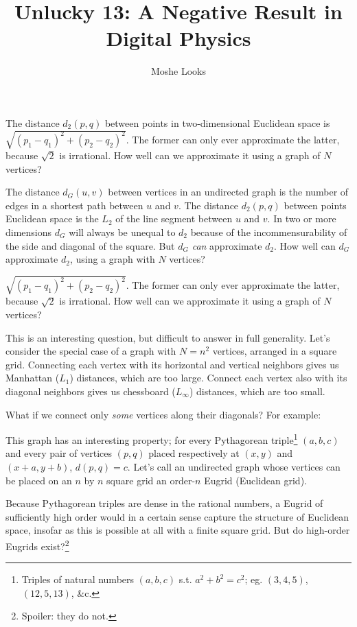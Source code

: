 \documentclass{article}
\begin{document}
\title{Unlucky 13: A Negative Result in Digital Physics}
\author{Moshe Looks}


\maketitle


The distance $d_2(p, q)$ between points in two-dimensional
Euclidean space is $\sqrt{(p_1 - q_1)^2 + (p_2 - q_2)^2}$. The former can only ever
approximate the latter, because $\sqrt{2}$ is irrational. How well can we approximate it
using a graph of $N$ vertices?


The distance $d_G(u, v)$ between vertices in an undirected graph is the number of edges in a
shortest path between $u$ and $v$. The distance $d_2(p, q)$ between points Euclidean space
is the $L_2$ of the line segment between $u$ and $v$. In two or more dimensions $d_G$ will
always be unequal to $d_2$ because of the incommensurability of the side and diagonal of the
square. But $d_G$ \emph{can} approximate $d_2$. How well can $d_G$ approximate $d_2$, using
a graph with $N$ vertices?


$\sqrt{(p_1 - q_1)^2 + (p_2 - q_2)^2}$. The former can only ever
approximate the latter, because $\sqrt{2}$ is irrational. How well can we approximate it
using a graph of $N$ vertices?

This is an interesting question, but difficult to answer in full generality. Let's consider
the special case of a graph with $N = n^2$ vertices, arranged in a square grid. Connecting
each vertex with its horizontal and vertical neighbors gives us Manhattan ($L_1$) distances,
which are too large. Connect each vertex also with its diagonal neighbors gives us chessboard
($L_\infty$) distances, which are too small.

What if we connect only \emph{some} vertices along their diagonals? For example:



This graph has an interesting property; for every Pythagorean triple\footnote{Triples of
natural numbers $(a, b, c)$ s.t. $a^2 + b^2 = c^2$; eg. $(3, 4, 5)$, $(12, 5, 13)$, \&c.}
$(a, b, c)$ and every pair of vertices $(p, q)$ placed respectively at $(x, y)$ and $(x + a,
y + b)$, $d(p, q) = c$. Let's call an undirected graph whose vertices can be placed on an $n$
by $n$ square grid an order-$n$ Eugrid (Euclidean grid).

Because Pythagorean triples are dense in the rational numbers, a Eugrid of sufficiently high
order would in a certain sense capture the structure of Euclidean space, insofar as this is
possible at all with a finite square grid. But do high-order Eugrids exist?\footnote{Spoiler:
they do not.}
\end{document}
